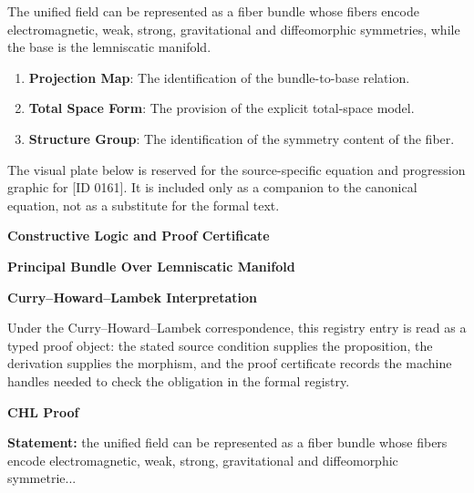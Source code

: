 The unified field can be represented as a fiber bundle whose fibers encode electromagnetic, weak, strong, gravitational and diffeomorphic symmetries, while the base is the lemniscatic manifold.
\endgroup

\begin{enumerate}[leftmargin=1.6em,itemsep=6pt,topsep=4pt]
\item \textbf{Projection Map}: The identification of the bundle-to-base relation.
\item \textbf{Total Space Form}: The provision of the explicit total-space model.
\item \textbf{Structure Group}: The identification of the symmetry content of the fiber.
\end{enumerate}

\begingroup\footnotesize\sloppy
The visual plate below is reserved for the source-specific equation and progression graphic for [ID 0161]. It is included only as a companion to the canonical equation, not as a substitute for the formal text.
\par\endgroup
\ifTZPDarkEdition
{}
\fi

\clearpage
\begingroup\tzpsupportsetup
\noindent\textbf{\fontsize{10.8pt}{12.8pt}\selectfont [ID 0161] Constructive Logic and Proof Certificate}\par
\noindent\textbf{\fontsize{10pt}{12pt}\selectfont Principal Bundle Over Lemniscatic Manifold}\par
\vspace{0.45em}
\begingroup
\footnotesize
\setlength{\parskip}{0.22em}
\setlength{\parindent}{0pt}
\noindent\textbf{Curry--Howard--Lambek Interpretation}\par
Under the Curry--Howard--Lambek correspondence, this registry entry is read as a typed proof
object: the stated source condition supplies the proposition, the derivation supplies the
morphism, and the proof certificate records the machine handles needed to check the obligation
in the formal registry.

\vspace{0.45em}
\noindent\textbf{CHL Proof}\par
\textbf{Statement:} the unified field can be represented as a fiber bundle whose fibers encode
electromagnetic, weak, strong, gravitational and diffeomorphic symmetrie...

